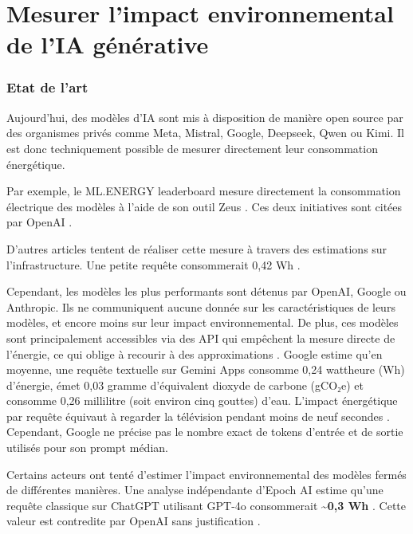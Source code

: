 \section{Mesurer l'impact environnemental de l'IA générative}
\subsubsection{Etat de l'art}
Aujourd'hui, des modèles d'IA sont mis à disposition de manière open source par des organismes privés comme Meta, Mistral, Google, Deepseek, Qwen ou Kimi. Il est donc techniquement possible de mesurer directement leur consommation énergétique. 

Par exemple, le ML.ENERGY leaderboard \cite{chung2025mlenergybenchmarkautomatedinference} mesure directement la consommation électrique des modèles à l'aide de son outil Zeus \cite{zeus-nsdi23}. Ces deux initiatives sont citées par OpenAI \cite{openai_academy_environmental_impact_ai}. 

D'autres articles tentent de réaliser cette mesure à travers des estimations sur l'infrastructure. Une petite requête consommerait 0,42 Wh \cite{jegham2025hungryaibenchmarkingenergy}.

Cependant, les modèles les plus performants sont détenus par OpenAI, Google ou Anthropic. Ils ne communiquent aucune donnée sur les caractéristiques de leurs modèles, et encore moins sur leur impact environnemental.
De plus, ces modèles sont principalement accessibles via des API qui empêchent la mesure directe de l'énergie, ce qui oblige à recourir à des approximations \cite{Luccioni_2024}.
Google estime qu'en moyenne, une requête textuelle sur Gemini Apps consomme 0,24 wattheure (Wh) d'énergie, émet 0,03 gramme d'équivalent dioxyde de carbone (gCO₂e) et consomme 0,26 millilitre (soit environ cinq gouttes) d'eau. L'impact énergétique par requête équivaut à regarder la télévision pendant moins de neuf secondes \cite{elsworth2025measuringenvironmentalimpactdelivering}. Cependant, Google ne précise pas le nombre exact de tokens d'entrée et de sortie utilisés pour son prompt médian.

Certains acteurs ont tenté d'estimer l'impact environnemental des modèles fermés de différentes manières.
Une analyse indépendante d'Epoch AI estime qu'une requête classique sur ChatGPT utilisant GPT-4o consommerait \textbf{\textasciitilde0,3 Wh} \cite{epoch_gradient_updates}. Cette valeur est contredite par OpenAI sans justification \cite{openai_academy_environmental_impact_ai}. 

